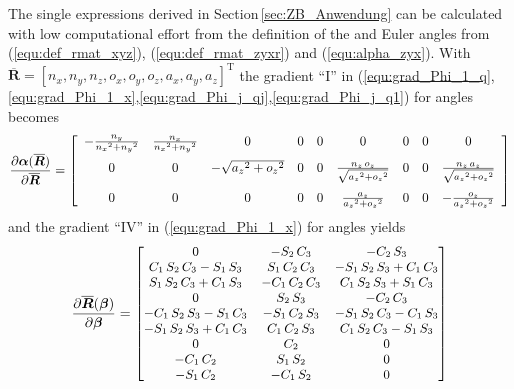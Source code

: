 \documentclass[robotics,article,accept,moreauthors,pdftex]{Definitions/mdpi}
\newcommand{\bm}[1]{\boldsymbol{#1}}
\newcommand{\transp}[0]{{\mathrm{T}}}
\begin{document}
The single expressions derived in Section\,\ref{sec:ZB_Anwendung} can be calculated with low computational effort from the definition of the  and Euler angles from (\ref{equ:def_rmat_xyz}), (\ref{equ:def_rmat_zyxr}) and (\ref{equ:alpha_zyx}).
With $\overline{\bm{R}}=[n_x,n_y,n_z ,o_x,o_y,o_z,a_x,a_y,a_z]^\transp$ the gradient ``I'' in (\ref{equ:grad_Phi_1_q},\ref{equ:grad_Phi_1_x},\ref{equ:grad_Phi_j_qj},\ref{equ:grad_Phi_j_q1}) for  angles becomes
%
\begin{equation}
\frac{\partial \bm{\alpha}(\overline{\bm{R}})}{\partial \overline{\bm{R}}}
=
\left[ \begin {array}{ccccccccc} -{\frac {{n_y}}{{{n_x}}^{2}+{{ n_y}}^{2}}}&{\frac {{n_x}}{{{n_x}}^{2}+{{n_y}}^{2}}}&0&0&0 &0&0&0&0\\ \noalign{\medskip}0&0&-\sqrt {{{a_z}}^{2}+{{o_z}}^{2} }&0&0&{\frac {{n_z}\,{o_z}}{\sqrt {{{a_z}}^{2}+{{o_z}}^{2} }}}&0&0&{\frac {{n_z}\,{a_z}}{\sqrt {{{a_z}}^{2}+{{o_z}}^{ 2}}}}\\ \noalign{\medskip}0&0&0&0&0&{\frac {{a_z}}{{{a_z}}^{2}+{ {o_z}}^{2}}}&0&0&-{\frac {{o_z}}{{{a_z}}^{2}+{{o_z}}^{2}}} \end {array} \right] 
\label{equ:alpha_xyz_diff_R}
\end{equation}
%
and the   gradient ``IV'' in (\ref{equ:grad_Phi_1_x}) for  angles yields
%
\begin{align}
\frac{\partial \overline{\bm{R}}(\bm{\beta})}{\partial \bm{\beta}}
=
\small
\begin{bmatrix}
    0&-{ S_2}\,{ C_3}&-{ C_2}\,{ S_3}
    \\ { C_1}\,{ S_2}\,{ C_3}-{ S_1}\,{ S_3}&{
        S_1}\,{ C_2}\,{ C_3}&-{ S_1}\,{ S_2}\,{ S_3}+{ C_1}\,{
        C_3}\\ { S_1}\,{ S_2}\,{ C_3}+{ C_1}\,{
        S_3}&-{ C_1}\,{ C_2}\,{ C_3}&{ C_1}\,{ S_2}\,{ S_3}+{
        S_1}\,{ C_3}\\ 0&{ S_2}\,{ S_3}&-{ C_2}\,
    { C_3}\\ -{ C_1}\,{ S_2}\,{ S_3}-{ S_1}\,{
        C_3}&-{ S_1}\,{ C_2}\,{ S_3}&-{ S_1}\,{ S_2}\,{ C_3}-{
        C_1}\,{ S_3}\\ -{ S_1}\,{ S_2}\,{ S_3}+{
        C_1}\,{ C_3}&{ C_1}\,{ C_2}\,{ S_3}&{ C_1}\,{ S_2}\,{
        C_3}-{ S_1}\,{ S_3}\\ 0&{ C_2}&0
    \\ -{ C_1}\,{ C_2}&{ S_1}\,{ S_2}&0
    \\ -{ S_1}\,{ C_2}&-{ C_1}\,{ S_2}&0
    \end {bmatrix}
\label{equ:rotmat_diff_beta}
\end{align}
\end{document}
